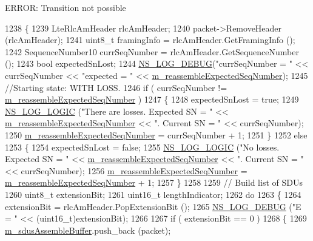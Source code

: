 E\+R\+R\+OR\+: Transition not possible
\begin{DoxyCode}
1238 \{
1239   LteRlcAmHeader rlcAmHeader;
1240   packet->RemoveHeader (rlcAmHeader);
1241   uint8\_t framingInfo = rlcAmHeader.GetFramingInfo ();
1242   SequenceNumber10 currSeqNumber = rlcAmHeader.GetSequenceNumber ();
1243   \textcolor{keywordtype}{bool} expectedSnLost;
1244   \hyperlink{group__logging_ga413f1886406d49f59a6a0a89b77b4d0a}{NS\_LOG\_DEBUG}(\textcolor{stringliteral}{"currSeqNumber = "} << currSeqNumber << \textcolor{stringliteral}{"expected = "} << 
      \hyperlink{classns3_1_1LteRlcAm_a98a0e0d29fe1254e55ac9b029d7b9934}{m\_reassembleExpectedSeqNumber});
1245   \textcolor{comment}{//Starting state: WITH LOSS.}
1246   \textcolor{keywordflow}{if} ( currSeqNumber != \hyperlink{classns3_1_1LteRlcAm_a98a0e0d29fe1254e55ac9b029d7b9934}{m\_reassembleExpectedSeqNumber} )
1247     \{
1248       expectedSnLost = \textcolor{keyword}{true};
1249       \hyperlink{group__logging_ga88acd260151caf2db9c0fc84997f45ce}{NS\_LOG\_LOGIC} (\textcolor{stringliteral}{"There are losses. Expected SN = "} << 
      \hyperlink{classns3_1_1LteRlcAm_a98a0e0d29fe1254e55ac9b029d7b9934}{m\_reassembleExpectedSeqNumber}  << \textcolor{stringliteral}{". Current SN = "} << currSeqNumber);
1250       \hyperlink{classns3_1_1LteRlcAm_a98a0e0d29fe1254e55ac9b029d7b9934}{m\_reassembleExpectedSeqNumber} = currSeqNumber + 1;
1251     \}
1252   \textcolor{keywordflow}{else}
1253     \{
1254       expectedSnLost = \textcolor{keyword}{false};
1255       \hyperlink{group__logging_ga88acd260151caf2db9c0fc84997f45ce}{NS\_LOG\_LOGIC} (\textcolor{stringliteral}{"No losses. Expected SN = "} << 
      \hyperlink{classns3_1_1LteRlcAm_a98a0e0d29fe1254e55ac9b029d7b9934}{m\_reassembleExpectedSeqNumber}  << \textcolor{stringliteral}{". Current SN = "} << currSeqNumber);
1256       \hyperlink{classns3_1_1LteRlcAm_a98a0e0d29fe1254e55ac9b029d7b9934}{m\_reassembleExpectedSeqNumber} = 
      \hyperlink{classns3_1_1LteRlcAm_a98a0e0d29fe1254e55ac9b029d7b9934}{m\_reassembleExpectedSeqNumber} + 1;
1257     \}
1258 
1259   \textcolor{comment}{// Build list of SDUs}
1260   uint8\_t extensionBit;
1261   uint16\_t lengthIndicator;
1262   \textcolor{keywordflow}{do}
1263     \{
1264       extensionBit = rlcAmHeader.PopExtensionBit ();
1265       \hyperlink{group__logging_ga413f1886406d49f59a6a0a89b77b4d0a}{NS\_LOG\_DEBUG} (\textcolor{stringliteral}{"E = "} << (uint16\_t)extensionBit);
1266 
1267       \textcolor{keywordflow}{if} ( extensionBit == 0 )
1268         \{
1269           \hyperlink{classns3_1_1LteRlcAm_a075262ee7d8d49e97ab0c48b5e763bf1}{m\_sdusAssembleBuffer}.push\_back (packet);

\end{DoxyCode}
